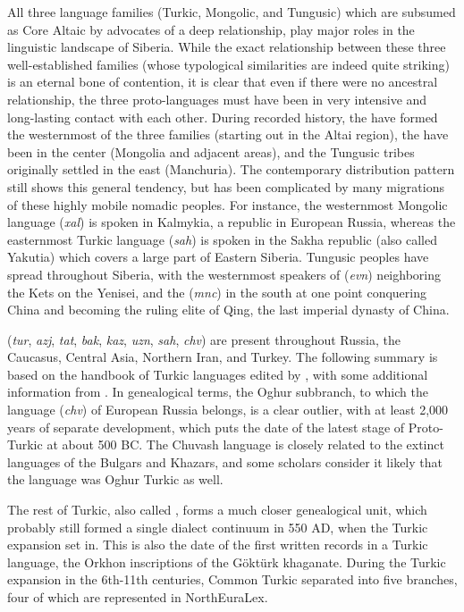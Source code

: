 All three language families (Turkic, Mongolic, and Tungusic) which are subsumed as Core Altaic by advocates of a deep relationship, play major roles in the linguistic landscape of Siberia. While the exact relationship between these three well-established families (whose typological similarities are indeed quite striking) is an eternal bone of contention, it is clear that even if there were no ancestral relationship, the three proto-languages must have been in very intensive and long-lasting contact with each other. During recorded history, the  have formed the westernmost of the three families (starting out in the Altai region), the  have been in the center (Mongolia and adjacent areas), and the Tungusic tribes originally settled in the east (Manchuria). The contemporary distribution pattern still shows this general tendency, but has been complicated by many migrations of these highly mobile nomadic peoples. For 
instance, the westernmost Mongolic language  (\textit{xal}) is spoken in Kalmykia, a republic in European Russia, whereas the easternmost Turkic language  (\textit{sah}) is spoken in the Sakha republic (also called Yakutia) which covers a large part of Eastern Siberia. Tungusic peoples have spread throughout Siberia, with the westernmost speakers of  (\textit{evn}) neighboring the Kets on the Yenisei, and the  (\textit{mnc}) in the south at one point conquering China and becoming the ruling elite of Qing, the last imperial dynasty of China.

 (\textit{tur}, \textit{azj}, \textit{tat}, \textit{bak}, \textit{kaz}, \textit{uzn}, \textit{sah}, \textit{chv}) are present throughout Russia, the Caucasus, Central Asia, Northern Iran, and Turkey. The following summary is based on the handbook of Turkic languages edited by \cite{johanson_csato_1998}, with some additional information from \cite{menges1995}. In genealogical terms, the Oghur subbranch, to which the  language (\textit{chv}) of European Russia belongs, is a clear outlier, with at least 2,000 years of separate development, which puts the date of the latest stage of Proto-Turkic at about 500 BC. The Chuvash language is closely related to the extinct languages of the Bulgars and Khazars, and some scholars consider it likely that the  language was Oghur Turkic as well.

The rest of Turkic, also called , forms a much closer genealogical unit,
which probably still formed a single dialect continuum in 550 AD, when the Turkic expansion set in. This is also the date of the first written records in a Turkic language, the Orkhon inscriptions of the G\"okt\"urk khaganate. During the Turkic expansion in the 6th-11th centuries, Common Turkic separated into five branches, four of which are represented in NorthEuraLex.

